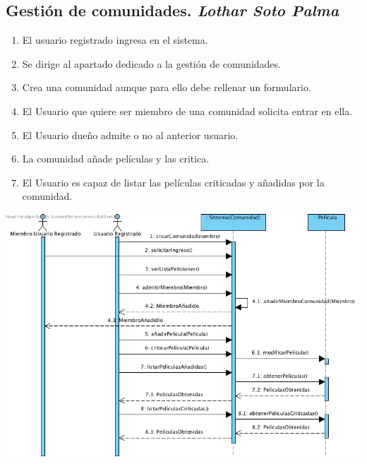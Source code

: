 \documentclass{article}
\begin{document}
	\subsection*{Gestión de comunidades. \textit{Lothar Soto Palma}}
	\begin{enumerate}
		\item El usuario registrado ingresa en el sistema.
		\item Se dirige al apartado dedicado a la gestión de comunidades.
		\item Crea una comunidad aunque para ello debe rellenar un formulario.
		\item El Usuario que quiere ser miembro de una comunidad solicita entrar en ella.
		\item El Usuario dueño admite o no al anterior usuario.
		\item La comunidad añade películas y las critica.
		\item El Usuario es capaz de listar las películas criticadas y añadidas por la comunidad.
	\end{enumerate}
		\includegraphics[width=1\linewidth]{./S-Comunidades}
\end{document}
